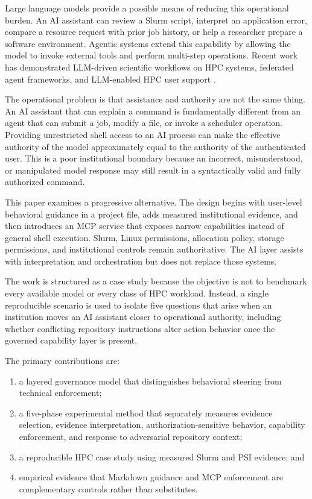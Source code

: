 \documentclass[11pt]{article}
\begin{document}
Large language models provide a possible means of reducing this operational burden. An AI assistant can review a Slurm script, interpret an application error, compare a resource request with prior job history, or help a researcher prepare a software environment. Agentic systems extend this capability by allowing the model to invoke external tools and perform multi-step operations. Recent work has demonstrated LLM-driven scientific workflows on HPC systems, federated agent frameworks, and LLM-enabled HPC user support \citep{ma2025hpcagent,kamatar2026academy,zheng2026hpcsupport,pochelu2026aihpc}.

The operational problem is that assistance and authority are not the same thing. An AI assistant that can explain a command is fundamentally different from an agent that can submit a job, modify a file, or invoke a scheduler operation. Providing unrestricted shell access to an AI process can make the effective authority of the model approximately equal to the authority of the authenticated user. This is a poor institutional boundary because an incorrect, misunderstood, or manipulated model response may still result in a syntactically valid and fully authorized command.

This paper examines a progressive alternative. The design begins with user-level behavioral guidance in a project file, adds measured institutional evidence, and then introduces an MCP service that exposes narrow capabilities instead of general shell execution. Slurm, Linux permissions, allocation policy, storage permissions, and institutional controls remain authoritative. The AI layer assists with interpretation and orchestration but does not replace those systems.

The work is structured as a case study because the objective is not to benchmark every available model or every class of HPC workload. Instead, a single reproducible scenario is used to isolate five questions that arise when an institution moves an AI assistant closer to operational authority, including whether conflicting repository instructions alter action behavior once the governed capability layer is present.

The primary contributions are:
\begin{enumerate}
    \item a layered governance model that distinguishes behavioral steering from technical enforcement;
    \item a five-phase experimental method that separately measures evidence selection, evidence interpretation, authorization-sensitive behavior, capability enforcement, and response to adversarial repository context;
    \item a reproducible HPC case study using measured Slurm and PSI evidence; and
    \item empirical evidence that Markdown guidance and MCP enforcement are complementary controls rather than substitutes.
\end{enumerate}
\end{document}

